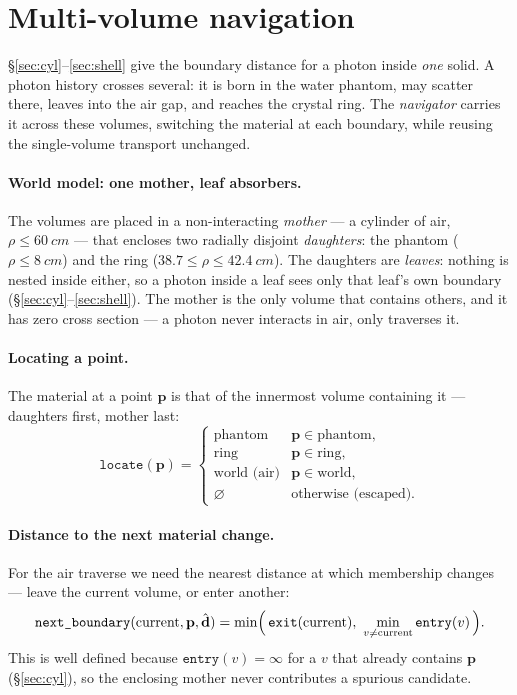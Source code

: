 \documentclass[11pt]{article}
\newcommand{\dvec}{\hat{\mathbf{d}}}
\begin{document}
\section{Multi-volume navigation}
\label{sec:nav}

\S\ref{sec:cyl}--\ref{sec:shell} give the boundary distance for a photon inside
\emph{one} solid. A photon history crosses several: it is born in the water phantom,
may scatter there, leaves into the air gap, and reaches the crystal ring. The
\emph{navigator} carries it across these volumes, switching the material at each
boundary, while reusing the single-volume transport unchanged.

\paragraph{World model: one mother, leaf absorbers.}
The volumes are placed in a non-interacting \emph{mother} --- a cylinder of air,
$\rho\le\SI{60}{cm}$ --- that encloses two radially disjoint \emph{daughters}: the
phantom ($\rho\le\SI{8}{cm}$) and the ring ($\SI{38.7}\le\rho\le\SI{42.4}{cm}$). The
daughters are \emph{leaves}: nothing is nested inside either, so a photon inside a leaf
sees only that leaf's own boundary (\S\ref{sec:cyl}--\ref{sec:shell}). The mother is the
only volume that contains others, and it has zero cross section --- a photon never
interacts in air, only traverses it.

\paragraph{Locating a point.}
The material at a point $\mathbf{p}$ is that of the innermost volume containing it ---
daughters first, mother last:
\begin{equation}
  \texttt{locate}(\mathbf{p}) =
  \begin{cases}
    \text{phantom} & \mathbf{p}\in\text{phantom},\\
    \text{ring}    & \mathbf{p}\in\text{ring},\\
    \text{world (air)} & \mathbf{p}\in\text{world},\\
    \varnothing    & \text{otherwise (escaped)}.
  \end{cases}
\end{equation}

\paragraph{Distance to the next material change.}
For the air traverse we need the nearest distance at which membership changes --- leave
the current volume, or enter another:
\begin{equation}
  \texttt{next\_boundary}(\text{current},\mathbf{p},\dvec) =
  \min\Bigl(\,\texttt{exit}(\text{current}),\ \min_{v\neq\text{current}}
  \texttt{entry}(v)\,\Bigr).
\end{equation}
This is well defined because $\texttt{entry}(v)=\infty$ for a $v$ that already contains
$\mathbf{p}$ (\S\ref{sec:cyl}), so the enclosing mother never contributes a spurious
candidate.
\end{document}
